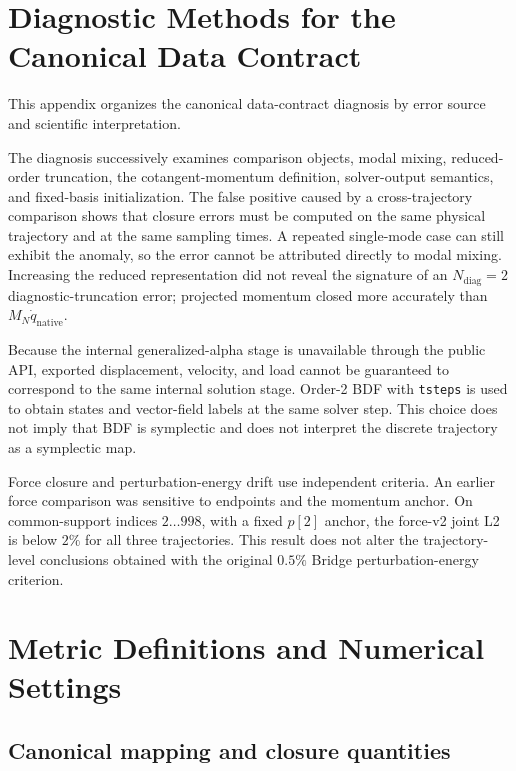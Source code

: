 \appendix

\section{Diagnostic Methods for the Canonical Data Contract}\label{app:canonical-diagnostic-chain}

This appendix organizes the canonical data-contract diagnosis by error source and scientific interpretation.



The diagnosis successively examines comparison objects, modal mixing, reduced-order truncation, the cotangent-momentum definition, solver-output semantics, and fixed-basis initialization. The false positive caused by a cross-trajectory comparison shows that closure errors must be computed on the same physical trajectory and at the same sampling times. A repeated single-mode case can still exhibit the anomaly, so the error cannot be attributed directly to modal mixing. Increasing the reduced representation did not reveal the signature of an \(N_{\mathrm{diag}}=2\) diagnostic-truncation error; projected momentum closed more accurately than \(M_N\dot q_{\mathrm{native}}\).

Because the internal generalized-alpha stage is unavailable through the public API, exported displacement, velocity, and load cannot be guaranteed to correspond to the same internal solution stage. Order-2 BDF with \texttt{tsteps} is used to obtain states and vector-field labels at the same solver step. This choice does not imply that BDF is symplectic and does not interpret the discrete trajectory as a symplectic map.

Force closure and perturbation-energy drift use independent criteria. An earlier force comparison was sensitive to endpoints and the momentum anchor. On common-support indices \(2\ldots998\), with a fixed \(p[2]\) anchor, the force-v2 joint L2 is below \(2\%\) for all three trajectories. This result does not alter the trajectory-level conclusions obtained with the original \(0.5\%\) Bridge perturbation-energy criterion.

\section{Metric Definitions and Numerical Settings}\label{app:numerical-settings}

\subsection{Canonical mapping and closure quantities}

